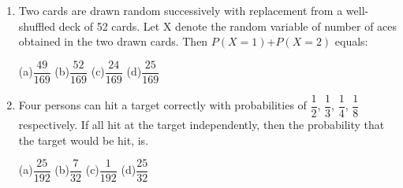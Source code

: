 \documentclass[journal,12pt,twocolumn]{IEEEtran}
\begin{document}
\begin{enumerate}[label=\arabic*]
	\begin{itemize}
	\begin{multicols}{4}
	\item[(a)]$\dfrac{2}{5}$  \item[(b])$\dfrac{1}{5}$  \item[(c)]$\dfrac{3}{4}$  \item[(d)]$\dfrac{3}{10}$\end{multicols}
	\end{itemize}
	\item Two cards are drawn random successively with replacement from a well-shuffled deck of 52 cards. Let X denote the random variable of number of aces obtained in the two drawn cards. Then $P(X = 1)$+$P(X = 2)$ equals:
	\begin{multicols}{4}
	(a)$\dfrac{49}{169}$ (b)$\dfrac{52}{169}$ (c)$\dfrac{24}{169}$ (d)$\dfrac{25}{169}$
	\end{multicols}
	\item Four persons can hit a target correctly with probabilities of $\dfrac{1}{2}$, $\dfrac{1}{3}$, $\dfrac{1}{4}$, $\dfrac{1}{8}$ respectively. If all hit at the target independently, then the probability that the target would be hit, is.
	\begin{multicols}{4}
		(a)$\dfrac{25}{192}$   (b)$\dfrac{7}{32}$   (c)$\dfrac{1}{192}$  (d)$\dfrac{25}{32}$\\		
		\end{multicols}
\end{enumerate}
\end{document}
